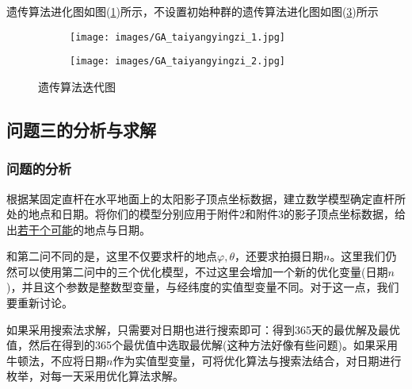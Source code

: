             \par
            遗传算法进化图如图(\ref{fig:太阳影子遗传算法迭代图})所示，不设置初始种群的遗传算法进化图如图(\ref{fig:不设置初始种群的遗传算法进化图})所示
                \begin{figure}[H]
                    \centering
                    \begin{subfigure}[b]{0.4\textwidth}
                        \texttt{[image: images/GA\_taiyangyingzi\_1.jpg]}
                        \caption{}
                        \label{fig:太阳影子遗传算法迭代图}
                    \end{subfigure}
                    \begin{subfigure}[b]{0.4\textwidth}
                        \texttt{[image: images/GA\_taiyangyingzi\_2.jpg]}
                        \caption{}
                        \label{fig:不设置初始种群的遗传算法进化图}
                    \end{subfigure}
                    \caption{遗传算法迭代图}
                \end{figure}

    \subsection{问题三的分析与求解}
        \subsubsection{问题的分析}
            \par
            根据某固定直杆在水平地面上的太阳影子顶点坐标数据，建立数学模型确定直杆所处的地点和日期。将你们的模型分别应用于附件2和附件3的影子顶点坐标数据，给出\underline{若干个可能}的地点与日期。
            \par
            和第二问不同的是，这里不仅要求杆的地点$\varphi,\theta$，还要求拍摄日期$n$。这里我们仍然可以使用第二问中的三个优化模型，不过这里会增加一个新的优化变量(日期$n$)，并且这个参数是整数型变量，与经纬度的实值型变量不同。对于这一点，我们要重新讨论。
            \par
            如果采用搜索法求解，只需要对日期也进行搜索即可：得到365天的最优解及最优值，然后在得到的365个最优值中选取最优解(这种方法好像有些问题)。如果采用牛顿法，不应将日期$n$作为实值型变量，可将优化算法与搜索法结合，对日期进行枚举，对每一天采用优化算法求解。
